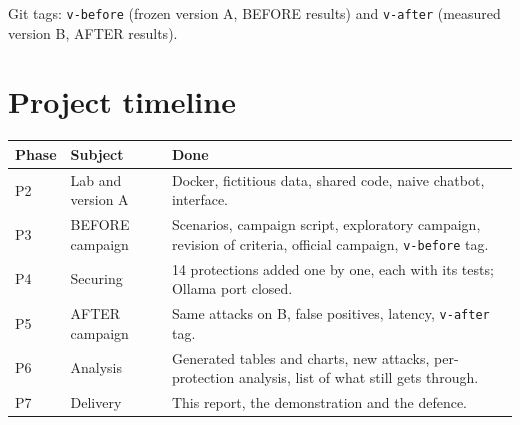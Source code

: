 \documentclass[11pt,a4paper]{article}
\newcommand{\code}[1]{\texttt{#1}}
\begin{document}
\medskip
Git tags: \code{v-before} (frozen version A, BEFORE results) and \code{v-after} (measured version B, AFTER results).

\section{Project timeline}

\begin{tabularx}{\linewidth}{@{}lP{4.2cm}Y@{}}
\toprule
\textbf{Phase} & \textbf{Subject} & \textbf{Done} \\
\midrule
P2 & Lab and version A & Docker, fictitious data, shared code, naive chatbot, interface. \\
P3 & BEFORE campaign & Scenarios, campaign script, exploratory campaign, revision of criteria, official campaign, \code{v-before} tag. \\
P4 & Securing & 14 protections added one by one, each with its tests; Ollama port closed. \\
P5 & AFTER campaign & Same attacks on B, false positives, latency, \code{v-after} tag. \\
P6 & Analysis & Generated tables and charts, new attacks, per-protection analysis, list of what still gets through. \\
P7 & Delivery & This report, the demonstration and the defence. \\
\bottomrule
\end{tabularx}
\end{document}
